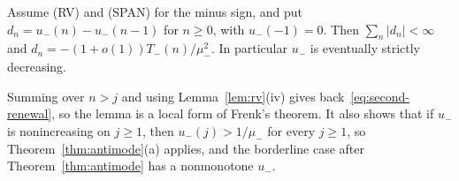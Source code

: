 \begin{lemma}\label{lem:diff-renewal}
Assume (RV) and (SPAN) for the minus sign, and put $d_n=u_\minus(n)-u_\minus(n-1)$ for
$n\ge0$, with $u_\minus(-1)=0$. Then $\sum_n|d_n|<\infty$ and
$d_n=-(1+o(1))T_\minus(n)/\mu_\minus^2$. In particular $u_\minus$ is eventually strictly
decreasing.
\end{lemma}

Summing over $n>j$ and using Lemma~\ref{lem:rv}(iv) gives back~\eqref{eq:second-renewal}, so
the lemma is a local form of Frenk's theorem. It also shows that if $u_\minus$ is
nonincreasing on $j\ge1$, then $u_\minus(j)>1/\mu_\minus$ for every $j\ge1$, so
Theorem~\ref{thm:antimode}(a) applies, and the borderline case after
Theorem~\ref{thm:antimode} has a nonmonotone $u_\minus$.

